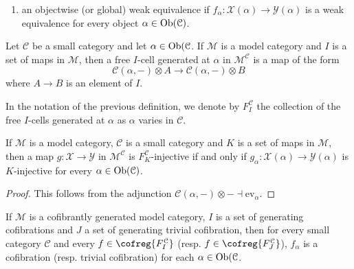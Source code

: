 \begin{refsection}
\begin{defin}
\begin{enumerate}
\item an objectwise (or global) weak equivalence if $f_\alpha \colon \mathcal X(\alpha) \to \mathcal Y(\alpha)$ is a weak equivalence for every object $\alpha \in \operatorname{Ob}(\mathcal C)$.
\end{enumerate}
\end{defin}

\begin{defin}
Let $\mathcal C$ be a small category and let $\alpha \in \operatorname{Ob}(\mathcal C$. If $\mathcal M$ is a model category and $I$ is a set of maps in $\mathcal M$, then a free $I$-cell generated at $\alpha$ in $\mathcal M^{\mathcal C}$ is a map of the form
\[
\mathcal C(\alpha,-) \otimes A \to \mathcal C(\alpha, -) \otimes B
\]
where $A \to B$ is an element of $I$.
\end{defin}

\begin{notation}
In the notation of the previous definition, we denote by $F^{\mathcal C}_I$ the collection of the free $I$-cells generated at $\alpha$ as $\alpha$ varies in $\mathcal C$.
\end{notation}

\begin{prop} \label{prop K-inj}
If $\mathcal M$ is a model category, $\mathcal C$ is a small category and $K$ is a set of maps in $\mathcal M$, then a map $g \colon \mathcal X \to \mathcal Y$ in $\mathcal M^{\mathcal C}$ is $F^{\mathcal C}_K$-injective if and only if $g_\alpha \colon \mathcal X(\alpha) \to \mathcal Y(\alpha)$ is $K$-injective for every $\alpha \in \operatorname{Ob}(\mathcal C)$.
\end{prop}

\begin{proof}
This follows from the adjunction $\mathcal C(\alpha, -) \otimes - \dashv \mathrm{ev}_\alpha$.
\end{proof}

\begin{prop} \label{cor objectwise implies global}
If $\mathcal M$ is a cofibrantly generated model category, $I$ is a set of generating cofibrations and $J$ a set of generating trivial cofibration, then for every small category $\mathcal C$ and every $f \in \cofreg{F^{\mathcal C}_I}$ (resp. $f \in \cofreg{F^{\mathcal C}_J}$), $f_\alpha$ is a cofibration (resp. trivial cofibration) for each $\alpha \in \operatorname{Ob}(\mathcal C$.
\end{prop}


\end{refsection}
